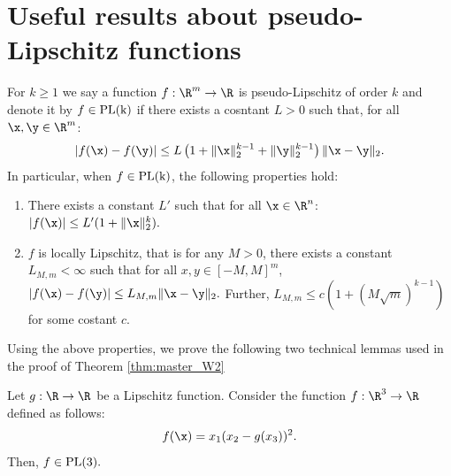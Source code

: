 





\section{Useful results about pseudo-Lipschitz functions}\label{SM useful fact}
For $k\geq 1$ we say a function $f:\R^m\rightarrow\R$ is pseudo-Lipschitz of order $k$ and denote it by $f\in \rm{PL}(k)$ if there exists a cosntant $L>0$ such that, for all $\x,\y\in\R^m$:
\begin{align}
|f(\x)-f(\y)|\leq L\left(1+\|\x\|_2^{k-1}+\|\y\|_2^{k-1}\right)\|\x-\y\|_2.\label{PL func}
\end{align}
In particular, when $f\in\rm{PL}(k)$, the following properties hold:
\begin{enumerate}
\item There exists a constant $L'$ such that for all $\x\in\R^n$: $|f(\x)|\leq L'(1+\|\x\|_2^k).$

\item $f$ is locally Lipschitz, that is for any $M>0$, there exists a constant $L_{M,m}<\infty$ such that for all $x,y\in[-M,M]^m$,
$
|f(\x)-f(\y)| \leq L_{M,m}\|\x-\y\|_2.
$
Further, $L_{M,m}\leq c(1+(M\sqrt{m})^{k-1})$ for some costant $c$.
\end{enumerate}

Using the above properties, we prove the following two technical lemmas used in the proof of Theorem \ref{thm:master_W2}

\begin{lemma}\label{lem:fL}
Let $g:\R\rightarrow\R$ be a Lipschitz function. Consider the function $f:\R^3\rightarrow\R$ defined as follows:
$$
f(\x) = x_1(x_2-g(x_3))^2.
$$
Then, $f\in\rm{PL}(3).$
\end{lemma}


